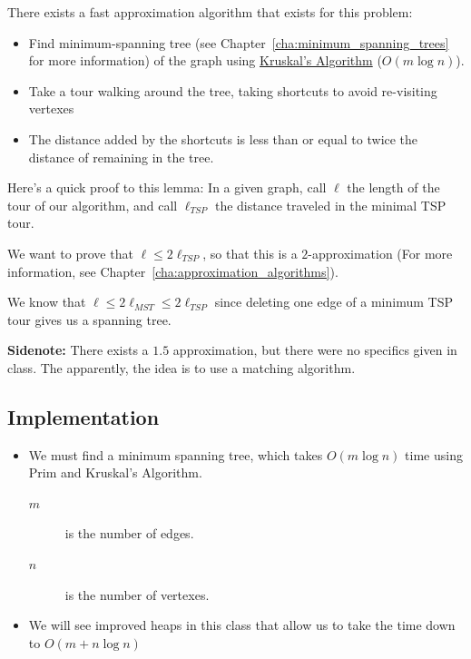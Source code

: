                There exists a fast approximation algorithm that exists for this problem:
                \begin{itemize}
                    \item Find minimum-spanning tree (see Chapter~\ref{cha:minimum_spanning_trees} for more information) of the graph using \href{https://en.wikipedia.org/wiki/Kruskal's_algorithm}{Kruskal's Algorithm} ($O(m \log n)$).
                    \item Take a tour walking around the tree, taking shortcuts to avoid re-visiting vertexes
                    \item The distance added by the shortcuts is less than or equal to twice the distance of remaining in the tree.
                \end{itemize}

                Here's a quick proof to this lemma:
                In a given graph, call $\ell$ the length of the tour of our algorithm, and call $\ell_{TSP}$ the distance traveled in the minimal \textsc{TSP} tour.

                We want to prove that $\ell \le 2 \ell_{TSP}$, so that this is a $2$-approximation (For more information, see Chapter~\ref{cha:approximation_algorithms}).

                We know that $\ell \le 2 \ell_{MST} \le 2 \ell_{TSP}$ since deleting one edge of a minimum \textsc{TSP} tour gives us a spanning tree.

                \textbf{Sidenote:} There exists a $1.5$ approximation, but there were no specifics given in class.
                The apparently, the idea is to use a matching algorithm.

                \subsection{Implementation} %
                \label{sub:implementation}
                    \begin{itemize}
                        \item We must find a minimum spanning tree, which takes $O(m\log n)$ time using Prim and Kruskal's Algorithm.
                            \begin{description}
                                \item[$m$] is the number of edges.
                                \item[$n$] is the number of vertexes.
                            \end{description}
                        \item We will see improved heaps in this class that allow us to take the time down to $O(m + n \log n)$
                    \end{itemize}

